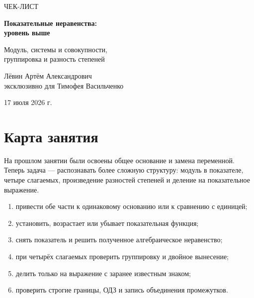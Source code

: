 \documentclass[a4paper,12pt]{article}
\renewcommand{\today}{17 июля 2026 г.}
\begin{document}
\sloppy

\begin{titlepage}
  \centering
  \vspace*{25mm}
  {\Large\textcolor{accent}{ЧЕК-ЛИСТ}\par}
  \vspace{9mm}
  {\fontsize{29}{35}\selectfont\bfseries Показательные неравенства:\\[2mm] уровень выше\par}
  \vspace{8mm}
  {\large Модуль, системы и совокупности,\\группировка и разность степеней\par}
  \vfill
  {\large Лёвин Артём Александрович\\эксклюзивно для Тимофея Васильченко\par}
  \vspace{8mm}
  {\large \today\par}
  \vfill
\end{titlepage}

\section{Карта занятия}

На прошлом занятии были освоены общее основание и замена переменной. Теперь задача --- распознавать более сложную структуру: модуль в показателе, четыре слагаемых, произведение разностей степеней и деление на показательное выражение.

\begin{enumerate}[itemsep=1pt]
  \item привести обе части к одинаковому основанию или к сравнению с единицей;
  \item установить, возрастает или убывает показательная функция;
  \item снять показатель и решить полученное алгебраическое неравенство;
  \item при четырёх слагаемых проверить группировку и двойное вынесение;
  \item делить только на выражение с заранее известным знаком;
  \item проверить строгие границы, ОДЗ и запись объединения промежутков.
\end{enumerate}
\end{document}
